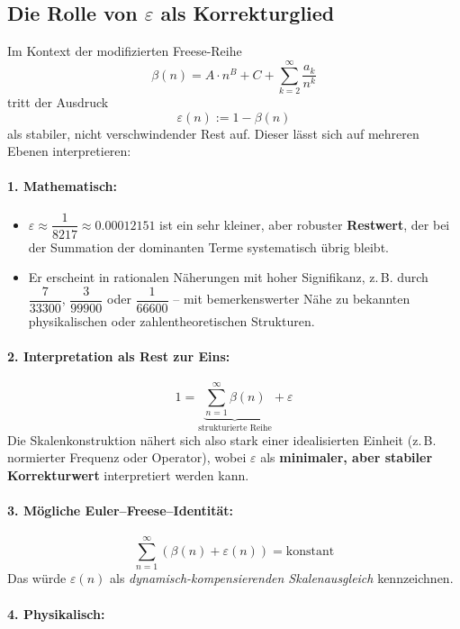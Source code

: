 \subsection*{Die Rolle von \texorpdfstring{$\varepsilon$}{ε} als Korrekturglied}

Im Kontext der modifizierten Freese-Reihe
\[
\beta(n) = A \cdot n^B + C + \sum_{k=2}^\infty \frac{a_k}{n^k}
\]
tritt der Ausdruck
\[
\varepsilon(n) := 1 - \beta(n)
\]
als stabiler, nicht verschwindender Rest auf. Dieser lässt sich auf mehreren Ebenen interpretieren:

\paragraph{1. Mathematisch:}

\begin{itemize}
    \item $\varepsilon \approx \dfrac{1}{8217} \approx 0.00012151$ ist ein sehr kleiner, aber robuster \textbf{Restwert}, der bei der Summation der dominanten Terme systematisch übrig bleibt.
    \item Er erscheint in rationalen Näherungen mit hoher Signifikanz, z.\,B. durch $\dfrac{7}{33300}$, $\dfrac{3}{99900}$ oder $\dfrac{1}{66600}$ – mit bemerkenswerter Nähe zu bekannten physikalischen oder zahlentheoretischen Strukturen.
\end{itemize}

\paragraph{2. Interpretation als Rest zur Eins:}
\[
1 = \underbrace{\sum_{n=1}^\infty \beta(n)}_{\text{strukturierte Reihe}} + \varepsilon
\]
Die Skalenkonstruktion nähert sich also stark einer idealisierten Einheit (z.\,B. normierter Frequenz oder Operator), wobei $\varepsilon$ als \textbf{minimaler, aber stabiler Korrekturwert} interpretiert werden kann.

\paragraph{3. Mögliche Euler–Freese–Identität:}
\[
\sum_{n=1}^{\infty} \left(\beta(n) + \varepsilon(n)\right) = \text{konstant}
\]
Das würde $\varepsilon(n)$ als \emph{dynamisch-kompensierenden Skalenausgleich} kennzeichnen.

\paragraph{4. Physikalisch:}

